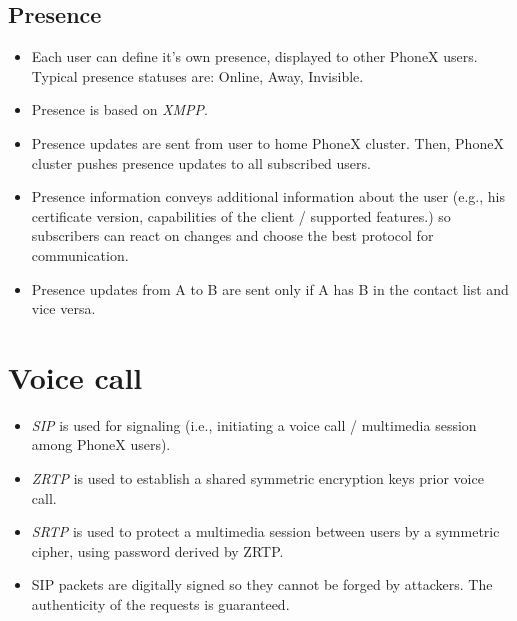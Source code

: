 \documentclass[a4paper,10pt]{article}
\begin{document}
\subsection{Presence}
\begin{itemize}
 \item Each user can define it's own presence, displayed to other PhoneX users. Typical presence statuses are: Online, Away, Invisible.
 \item Presence is based on \emph{XMPP}. 
 \item Presence updates are sent from user to home PhoneX cluster. Then, PhoneX cluster pushes presence updates to all subscribed users.
 \item Presence information conveys additional information about the user (e.g., his certificate version, capabilities of the client / supported features.) so subscribers can react on 
changes and choose the best protocol for communication.
 \item Presence updates from A to B are sent only if A has B in the contact list and vice versa.
\end{itemize}

\section{Voice call}
\begin{itemize}
 \item \emph{SIP} is used for signaling (i.e., initiating a voice call / multimedia session among PhoneX users).
 \item \emph{ZRTP} is used to establish a shared symmetric encryption keys prior voice call. 
 \item \emph{SRTP} is used to protect a multimedia session between users by a symmetric cipher, using password derived by ZRTP.
 \item SIP packets are digitally signed so they cannot be forged by attackers. The authenticity of the requests is guaranteed.
\end{itemize}
 
\end{document}
